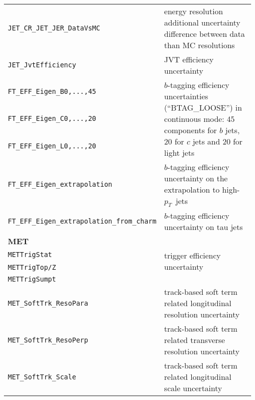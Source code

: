 \begin{table}
{\begin{tabular}{ll}
  \texttt{JET\_CR\_JET\_JER\_DataVsMC} & energy resolution additional uncertainty difference between data than MC resolutions \\%
  \texttt{JET\_JvtEfficiency} & JVT efficiency uncertainty \\%
  \texttt{FT\_EFF\_Eigen\_B0,...,45} & \multirow{3}{*}{\parbox{11cm}{$b$-tagging efficiency uncertainties (``BTAG\_LOOSE'') in continuous mode: 45 components for $b$ jets, 20 for $c$ jets and 20 for light jets}} \\%
  \texttt{FT\_EFF\_Eigen\_C0,...,20} &\\%
  \texttt{FT\_EFF\_Eigen\_L0,...,20} &\\%
  \texttt{FT\_EFF\_Eigen\_extrapolation} & $b$-tagging efficiency uncertainty on the extrapolation to high-$p_T$\ jets \\%
  \texttt{FT\_EFF\_Eigen\_extrapolation\_from\_charm} & $b$-tagging efficiency uncertainty on tau jets \\%
  {\bfseries MET}&\\
  \texttt{METTrigStat}  &  \multirow{2}{*}{trigger efficiency uncertainty} \\%
  \texttt{METTrigTop/Z} & \\%
  \texttt{METTrigSumpt} & \\%
  \texttt{MET\_SoftTrk\_ResoPara} & track-based soft term related longitudinal resolution uncertainty \\%
  \texttt{MET\_SoftTrk\_ResoPerp} &  track-based soft term related transverse resolution uncertainty \\%
  \texttt{MET\_SoftTrk\_Scale} & track-based soft term related longitudinal scale uncertainty \\%

\end{tabular}}
\end{table}
